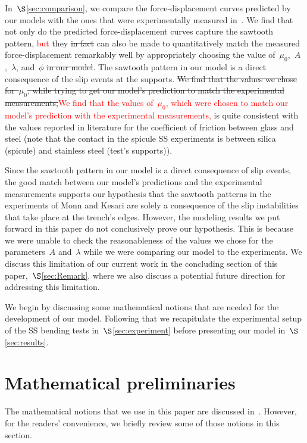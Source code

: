 \documentclass[preprint,10pt,times]{elsarticle}
\numberwithin{equation}{section}
\begin{document}
In~$\S$\ref{sec:comparison}, we compare the force-displacement
curves predicted by our models with the ones that were experimentally
measured in~\cite{monn2017enhanced,Sayaka2021Sawtooth}. We find
that not only do the predicted force-displacement curves capture the
sawtooth pattern, \textcolor{red}{but} they \sout{in fact} can also be made to quantitatively
match the measured force-displacement remarkably well by appropriately
choosing the value of~$\mu_0$,~$A$,~$\lambda$, and~$\phi$\sout{
in our model}. The sawtooth pattern in our model is a direct consequence
of the slip events at the supports. \sout{We find that the values we chose
for~$\mu_0$, while trying to get our model's prediction to match
the experimental measurements,}\textcolor{red}{We find that the values of~$\mu_0$, which were chosen to match our model's prediction with the experimental measurements,} is quite consistent with the values
reported in literature for the coefficient of friction between glass
and steel (note that the contact in the spicule SS experiments is
between silica (spicule) and stainless steel (test's supports)).

Since the sawtooth pattern in our model is a direct consequence of
slip events, the good match between our model's predictions and the
experimental measurements supports our hypothesis that the sawtooth
patterns in the experiments of Monn and Kesari are solely a consequence
of the slip instabilities that take place at the trench's edges. However,
the modeling results we put forward in this paper do not conclusively
prove our hypothesis. This is because we were unable to check the
reasonableness of the values we chose for the parameters~$A$ and~$\lambda$
while we were comparing our model to the experiments. We discuss this
limitation of our current work in the concluding section of this paper,~$\S$\ref{sec:Remark},
where we also discuss a potential future direction for addressing
this limitation.

We begin by discussing some mathematical notions that are needed for
the development of our model. Following that we recapitulate the experimental
setup of the SS bending tests in~$\S$\ref{sec:experiment} before
presenting our model in~$\S$\ref{sec:results}.

\section{Mathematical preliminaries\label{sec:notion}}

The mathematical notions that we use in this paper are discussed in~\cite[Section 2.1,][]{Sayaka2021Sawtooth}.
However, for the readers' convenience, we briefly review some of those
notions in this section.
\end{document}

